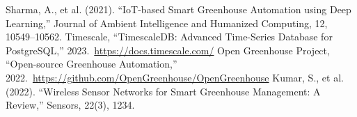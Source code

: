 \documentclass[12pt,a4paper]{article}
\begin{document}
\begin{thebibliography}{99}
 Sharma, A., et al. (2021). ``IoT-based Smart Greenhouse Automation using Deep Learning,'' Journal of Ambient Intelligence and Humanized Computing, 12, 10549--10562.
 Timescale, ``TimescaleDB: Advanced Time-Series Database for PostgreSQL,'' 2023.\ \url{https://docs.timescale.com/}
 Open Greenhouse Project, ``Open-source Greenhouse Automation,'' 2022.\ \url{https://github.com/OpenGreenhouse/OpenGreenhouse}
 Kumar, S., et al. (2022). ``Wireless Sensor Networks for Smart Greenhouse Management: A Review,'' Sensors, 22(3), 1234.
\end{thebibliography}
\end{document}
